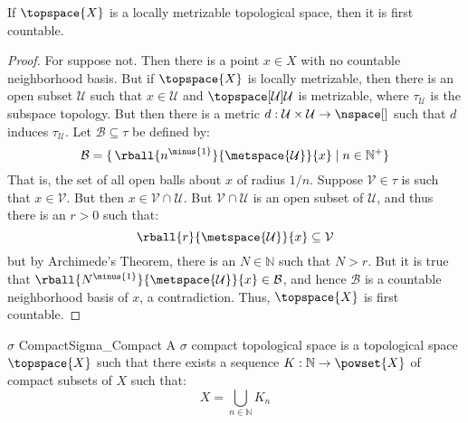 \documentclass{article}                                                        %
\begin{document}
        \begin{theorem}
            \label{thm:Locally_Metrizable_is_First_Countable}%
            If $\topspace{X}$ is a locally metrizable topological space, then it
            is first countable.
        \end{theorem}
        \begin{proof}
            For suppose not. Then there is a point $x\in{X}$ with no countable
            neighborhood basis. But if $\topspace{X}$ is locally metrizable,
            then there is an open subset $\mathcal{U}$ such that
            $x\in\mathcal{U}$ and $\topspace[\mathcal{U}]{\mathcal{U}}$ is
            metrizable, where $\tau_{\mathcal{U}}$ is the subspace topology. But
            then there is a metric
            $d:\mathcal{U}\times\mathcal{U}\rightarrow\nspace[]$ such that
            $d$ induces $\tau_{\mathcal{U}}$. Let $\mathcal{B}\subseteq\tau$ be
            defined by:
            \begin{equation}
                \mathcal{B}=\{\,\rball{n^{\minus{1}}}{\metspace{\mathcal{U}}}{x}
                    \;|\;n\in\mathbb{N}^{+}\}
            \end{equation}
            That is, the set of all open balls about $x$ of radius $1/n$.
            Suppose $\mathcal{V}\in\tau$ is such that $x\in\mathcal{V}$. But
            then $x\in\mathcal{V}\cap\mathcal{U}$. But
            $\mathcal{V}\cap\mathcal{U}$ is an open subset of $\mathcal{U}$, and
            thus there is an $r>0$ such that:
            \begin{equation}
                \rball{r}{\metspace{\mathcal{U}}}{x}\subseteq\mathcal{V}
            \end{equation}
            but by Archimede's Theorem, there is an $N\in\mathbb{N}$ such that
            $N>r$. But it is true that
            $\rball{N^{\minus{1}}}{\metspace{\mathcal{U}}}{x}\in\mathcal{B}$,
            and hence $\mathcal{B}$ is a countable neighborhood basis of $x$,
            a contradiction. Thus, $\topspace{X}$ is first countable.
        \end{proof}
        \begin{fdefinition}{$\sigma$ Compact}{Sigma_Compact}
            A $\sigma$ compact topological space is a topological space
            $\topspace{X}$ such that there exists a sequence
            $K:\mathbb{N}\rightarrow\powset{X}$ of compact subsets of $X$ such
            that:
            \begin{equation*}
                X=\bigcup_{n\in\mathbb{N}}K_{n}
            \end{equation*}
        \end{fdefinition}
\end{document}
